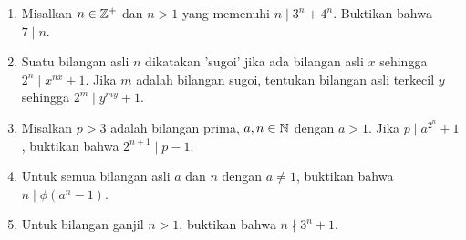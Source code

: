 \documentclass[12pt]{scrartcl}
\begin{document}
\begin{enumerate}
    
    \item Misalkan $n \in \mathbb Z^+$ dan $n > 1$ yang memenuhi $n \mid 3^n + 4^n$. Buktikan bahwa $7 \mid n$.
    
    \item Suatu bilangan asli $n$ dikatakan 'sugoi' jika ada bilangan asli $x$ sehingga $2^n \mid x^{nx}+1$. Jika $m$ adalah bilangan sugoi, tentukan bilangan asli terkecil $y$ sehingga $2^m \mid y^{my}+1$.
    
    
    \item Misalkan $p>3$ adalah bilangan prima, $a,n \in \mathbb N$ dengan $a > 1$. Jika $p \mid a^{2^n}+1$, buktikan bahwa $2^{n+1} \mid p-1$.
    
    \item Untuk semua bilangan asli $a$ dan $n$ dengan $a \neq 1$, buktikan bahwa $n \mid \phi(a^n-1)$.
    
    \item Untuk bilangan ganjil $n > 1$, buktikan bahwa $n \nmid 3^n+1$.
\end{enumerate}
\end{document}
